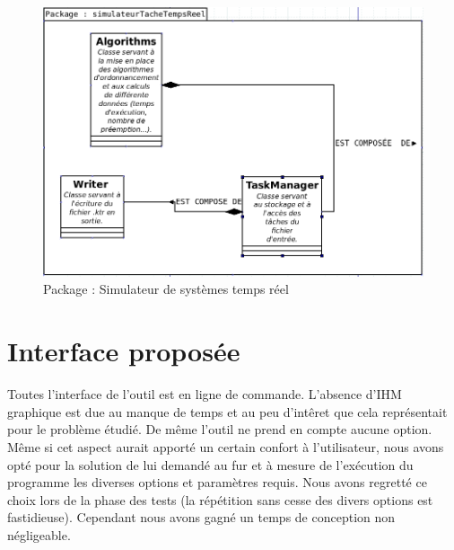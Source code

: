    \begin{figure}[htbp]
  \centering
  \includegraphics[scale=0.55]{img/packsstr}
  \caption{Package : Simulateur de systèmes temps réel}
  \label{fig:sstr}
\end{figure}
\section{Interface proposée}
Toutes l'interface de l'outil est en ligne de commande. L'absence d'IHM graphique est due au manque de temps et au peu d'intêret que cela représentait pour le problème étudié. De même l'outil ne prend en compte aucune option. Même si cet aspect aurait apporté un certain confort à l'utilisateur, nous avons opté pour la solution de lui demandé au fur et à mesure de l'exécution du programme les diverses options et paramètres requis. Nous avons regretté ce choix lors de la phase des tests (la répétition sans cesse des divers options est fastidieuse). Cependant nous avons gagné un temps de conception non négligeable. 


